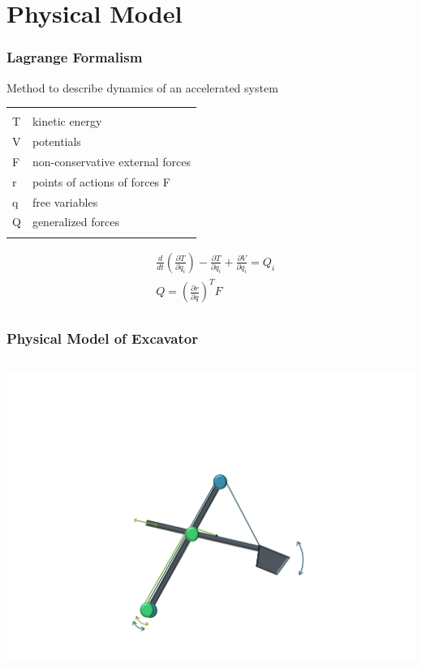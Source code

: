 \section{Physical Model}

\begin{frame}
	\frametitle{Lagrange Formalism}
	Method to describe dynamics of an accelerated system\\
	\begin{small}
	\begin{tabular}{ll}
		 & \\
		T & kinetic energy\\
		V & potentials\\
		F & non-conservative external forces\\
		r & points of actions of forces F\\ %
		q & free variables\\
		Q & generalized forces\\ \\
	\end{tabular}
	\end{small}
	
	\begin{align*}
	&\frac{d}{dt}\left(\frac{\partial T}{\partial \dot{q}_i}\right) -
	\frac{\partial T}{\partial q_i} +
	\frac{\partial V}{\partial q_i}
	= Q_i \\
	& Q = \left(\frac{\partial r}{\partial q}\right)^T F\\
	\end{align*}
		
\end{frame}	

\begin{frame}
	\frametitle{Physical Model of Excavator}
	
	
	\begin{columns}
			\centering
			\includegraphics[trim=30cm 5cm 30cm 23cm, clip=true, width=\linewidth]{img/Excavator_Only}
	\end{columns}
	
\end{frame}

